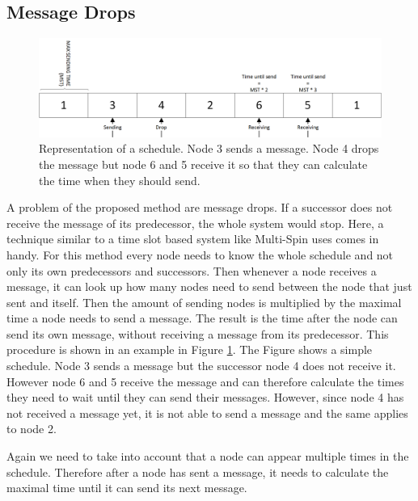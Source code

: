 \subsection{Message Drops}
\label{chp:apr_samplingDrops}
\begin{figure} [htbp]
	\centering         
    \includegraphics[scale=0.8]{content/images/MessageDrop}
    \caption{Representation of a schedule. Node 3 sends a message. Node 4 drops the message but node 6 and 5 receive it so that they can calculate the time when they should send.}
    \label{fig:msgDrop}
\end{figure}
A problem of the proposed method are message drops. If a successor does not receive the message of its predecessor, the whole system would stop. Here, a technique similar to a time slot based system like Multi-Spin uses comes in handy. For this method every node needs to know the whole schedule and not only its own predecessors and successors. Then whenever a node receives a message, it can look up how many nodes need to send between the node that just sent and itself. Then the amount of sending nodes is multiplied by the maximal time a node needs to send a message. The result is the time after the node can send its own message, without receiving a message from its predecessor. This procedure is shown in an example in Figure \ref{fig:msgDrop}. The Figure shows a simple schedule. Node 3 sends a message but the successor node 4 does not receive it. However node 6 and 5 receive the message and can therefore calculate the times they need to wait until they can send their messages. However, since node 4 has not received a message yet, it is not able to send a message and the same applies to node 2. 

Again we need to take into account that a node can appear multiple times in the schedule. Therefore after a node has sent a message, it needs to calculate the maximal time until it can send its next message.